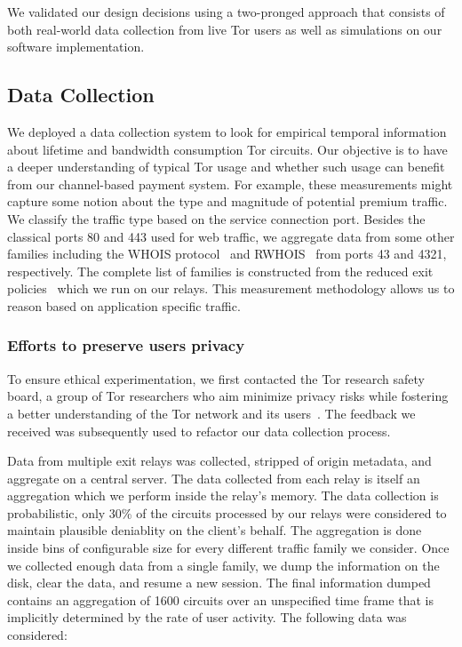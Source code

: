 We validated our design decisions using a two-pronged approach that consists of
both real-world data collection from live Tor users as well as simulations on
our software implementation.

\subsection{Data Collection}
\label{subsec:datacollection}

We deployed a data collection system to look for empirical temporal information
about lifetime and bandwidth consumption Tor circuits. Our objective is to have
a deeper understanding of typical Tor usage and whether such usage can benefit
from our channel-based payment system. For example, these measurements might
capture some notion about the type and magnitude of potential premium
traffic. We classify the traffic type based on the service connection
port. Besides the classical ports 80 and 443 used for web traffic, we aggregate
data from some other families including the WHOIS protocol~\cite{rfc3912} and
RWHOIS~\cite{rfc2167} from ports 43 and 4321, respectively. The complete list of
families is constructed from the reduced exit
policies~\cite{reducedexitpolicies} which we run on our relays. This measurement
methodology allows us to reason based on application specific traffic.


\subsubsection{Efforts to preserve users privacy}

To ensure ethical experimentation, we first contacted the Tor research safety
board, a group of Tor researchers who aim minimize privacy risks while fostering
a better understanding of the Tor network and its users~\cite{torsafety}. The
feedback we received was subsequently used to refactor our data collection
process.

Data from multiple exit relays was collected, stripped of origin metadata, and
aggregate on a central server. The data collected from each relay is itself an
aggregation which we perform inside the relay's memory. The data collection is
probabilistic, only 30\% of the circuits processed by our relays were considered
to maintain plausible deniablity on the client's behalf. The aggregation is done
inside bins of configurable size for every different traffic family we
consider. Once we collected enough data from a single family, we dump the
information on the disk, clear the data, and resume a new session. The final
information dumped contains an aggregation of 1600 circuits over an unspecified
time frame that is implicitly determined by the rate of user activity. The
following data was considered:

